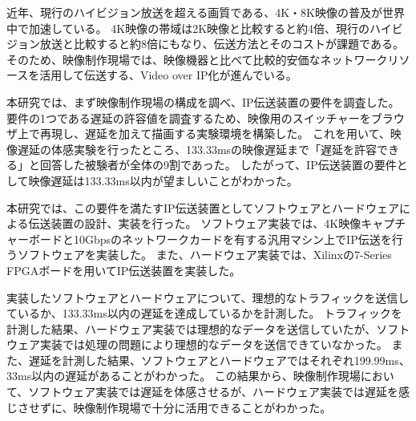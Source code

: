 
\begin{jabstract}

近年、現行のハイビジョン放送を超える画質である、4K・8K映像の普及が世界中で加速している。
4K映像の帯域は2K映像と比較すると約4倍、現行のハイビジョン放送と比較すると約8倍にもなり、伝送方法とそのコストが課題である。
そのため、映像制作現場では、映像機器と比べて比較的安価なネットワークリソースを活用して伝送する、Video over IP化が進んでいる。

本研究では、まず映像制作現場の構成を調べ、IP伝送装置の要件を調査した。
要件の1つである遅延の許容値を調査するため、映像用のスイッチャーをブラウザ上で再現し、遅延を加えて描画する実験環境を構築した。
これを用いて、映像遅延の体感実験を行ったところ、133.33msの映像遅延まで「遅延を許容できる」と回答した被験者が全体の9割であった。
したがって、IP伝送装置の要件として映像遅延は133.33ms以内が望ましいことがわかった。

本研究では、この要件を満たすIP伝送装置としてソフトウェアとハードウェアによる伝送装置の設計、実装を行った。
ソフトウェア実装では、4K映像キャプチャーボードと10Gbpsのネットワークカードを有する汎用マシン上でIP伝送を行うソフトウェアを実装した。
また、ハードウェア実装では、Xilinxの7-Series FPGAボードを用いてIP伝送装置を実装した。

実装したソフトウェアとハードウェアについて、理想的なトラフィックを送信しているか、133.33ms以内の遅延を達成しているかを計測した。
トラフィックを計測した結果、ハードウェア実装では理想的なデータを送信していたが、ソフトウェア実装では処理の問題により理想的なデータを送信できていなかった。
また、遅延を計測した結果、ソフトウェアとハードウェアではそれぞれ199.99ms、33ms以内の遅延があることがわかった。
この結果から、映像制作現場において、ソフトウェア実装では遅延を体感させるが、ハードウェア実装では遅延を感じさせずに、映像制作現場で十分に活用できることがわかった。




\end{jabstract}


